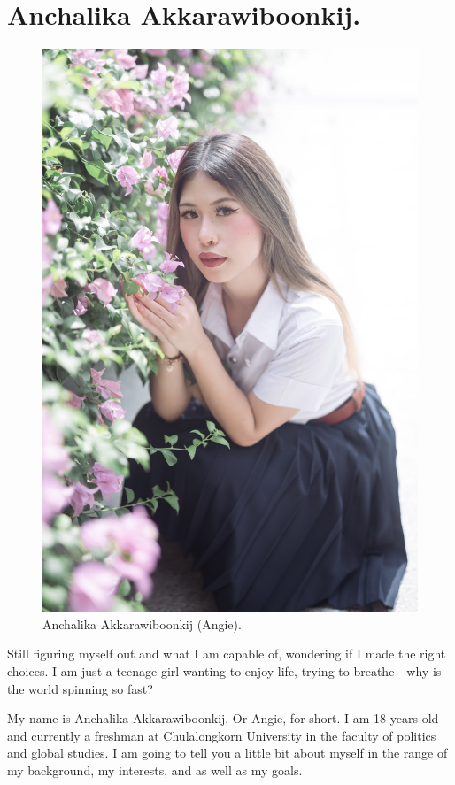 \documentclass[11pt]{book}
\begin{document}
		\chapter{Anchalika Akkarawiboonkij.}
						\begin{figure}[H]
							\begin{center}
  							\includegraphics[scale=0.125]{Photos/Anchalika_Akk.jpg}
  							\end{center}
 							\caption{Anchalika Akkarawiboonkij (Angie).}
						\end{figure}
Still figuring myself out and what I am capable of, wondering if I made the right choices. I am just a teenage girl wanting to enjoy life, trying to breathe—why is the world spinning so fast?

My name is Anchalika Akkarawiboonkij. Or Angie, for short. I am 18 years old and currently a freshman at Chulalongkorn University in the faculty of politics and global studies. I am going to tell you a little bit about myself in the range of my background, my interests, and as well as my goals.
\end{document}
